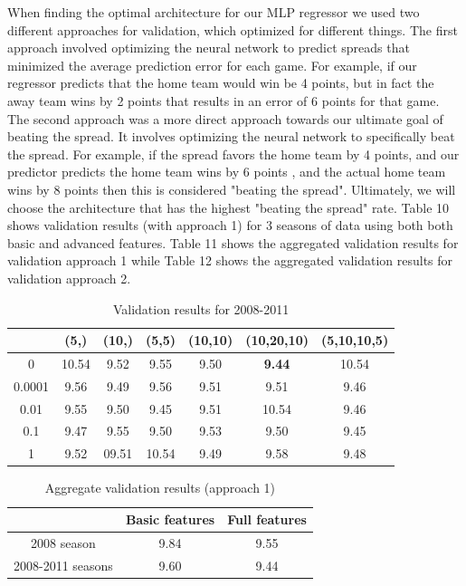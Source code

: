 \documentclass{article}
\begin{document}
When finding the optimal architecture for our MLP regressor we used two different approaches for validation, which optimized for different things. The first approach involved optimizing the neural network to predict spreads that minimized the average prediction error for each game. For example, if our regressor predicts that the home team would win be 4 points, but in fact the away team wins by 2 points that results in an error of 6 points for that game. The second approach was a more direct approach towards our ultimate goal of beating the spread. It involves optimizing the neural network to specifically beat the spread. For example, if the spread favors the home team by 4 points, and our predictor predicts the home team wins by 6 points , and the actual home team wins by 8 points then this is considered "beating the spread". Ultimately, we will choose the architecture that has the highest "beating the spread" rate. Table 10 shows validation results (with approach 1) for 3 seasons of data using both both basic and advanced features. Table 11 shows the aggregated validation results for validation approach 1 while Table 12 shows the aggregated validation results for validation approach 2.

\begin{table}
  \begin{center}
    \begin{tabular}{ | c | c | c | c | c | c | c |}
      \hline
            &             	(5,) & 	(10,) & 	(5,5) &  	(10,10) & 	(10,20,10) & 	(5,10,10,5)  \\ \hline
	0  &     	10.54 & 	9.52&	9.55&	9.50&	\textbf{9.44}&	10.54	    \\ \hline
	0.0001 &   9.56 &     	9.49&	9.56&	9.51&	9.51&		9.46	    \\ \hline
	0.01  &    	9.55 &     	9.50& 	9.45&	9.51&	10.54&		9.46	    \\ \hline
	0.1	&	9.47&	9.55 &	9.50&	9.53&	9.50&		9.45	    \\ \hline
	1&		9.52&	09.51&	10.54&	9.49&	9.58&		9.48	    \\ \hline

    \end{tabular}
  \end{center}
  \caption{Validation results for 2008-2011}
\end{table}

\begin{table}
  \begin{center}
    \begin{tabular}{ | c | c | c |}
      \hline
            &            	Basic features & 	Full features \\ \hline
	2008 season  &     	9.84 & 	9.55    \\ \hline
	2008-2011 seasons &   9.60&  9.44 \\ \hline


    \end{tabular}
  \end{center}
  \caption{Aggregate validation results (approach 1)}
\end{table}
\end{document}
